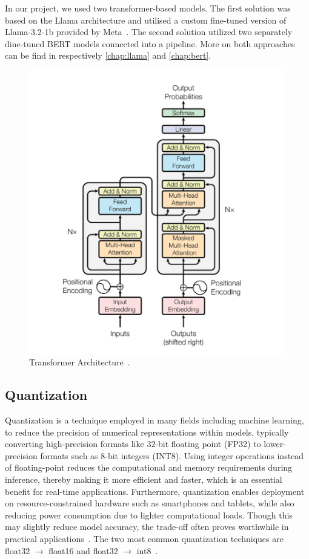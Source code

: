 \documentclass[licencjacka,en]{pracamgr}
\begin{document}
In our project, we used two transformer-based models. The first solution was based on the Llama architecture and utilised a custom fine-tuned version of Llama-3.2-1b provided by Meta~\cite{meta-llama}.
The second solution utilized two separately dine-tuned BERT models connected into a pipeline. More on both approaches can be find in respectively \ref{chap:llama} and \ref{chap:bert}.


\begin{figure}
    \centering
    \includegraphics[width=0.5\linewidth]{bachelor_images/transformer_arch.png}
    \caption{Transformer Architecture~\cite{attention}.}
    \label{fig:transformers_fig}
\end{figure}

\subsection{Quantization}
Quantization is a technique employed in many fields including machine learning, to reduce the precision of numerical representations within models, typically converting high-precision formats like 32-bit floating point (FP32) to lower-precision formats such as 8-bit integers (INT8). Using integer operations instead of floating-point reduces the computational and memory requirements during inference, thereby making it more efficient and faster, which is an essential benefit for real-time applications. Furthermore, quantization enables deployment on resource-constrained hardware such as smartphones and tablets, while also reducing power consumption due to lighter computational loads. Though this may slightly reduce model accuracy, the trade-off often proves worthwhile in practical applications~\cite{ibm_quantization}.
The two most common quantization techniques are float32 $\rightarrow$ float16 and float32 $\rightarrow$ int8~\cite{quant_hf}.
\end{document}
